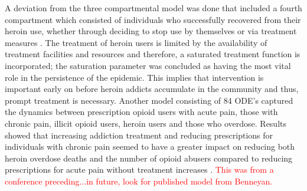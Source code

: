\documentclass[12pt]{article}
\begin{document}
A deviation from the three compartmental model was done that included a fourth compartment which consisted of individuals who successfully recovered from their heroin use, whether through deciding to stop use by themselves or via treatment measures \cite{Wangari}. The treatment of heroin users is limited by the availability of treatment facilities and resources and therefore, a saturated treatment function is incorporated; the saturation parameter was concluded as having the most vital role in the persistence of the epidemic. This implies that intervention is important early on before heroin addicts accumulate in the community and thus, prompt treatment is necessary. 
Another model consisting of 84 ODE's captured the dynamics between prescription opioid users with acute pain, those with chronic pain, illicit opioid users, heroin users and those who overdose. Results showed that increasing addiction treatment and reducing prescriptions for individuals with chronic pain seemed to have a greater impact on reducing both heroin overdose deaths and the number of opioid abusers compared to reducing prescriptions for acute pain without treatment increases \cite{Benneyan}. \textcolor{red}{This was from a conference preceding...in future, look for published model from Benneyan.} 

\end{document}
